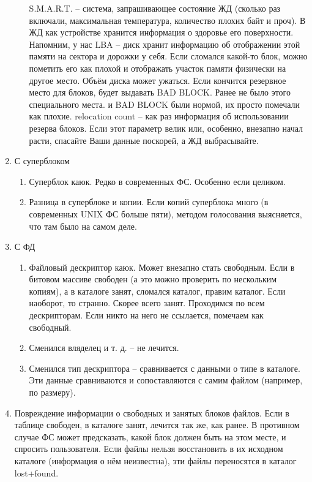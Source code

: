 \documentclass[a4paper,10pt]{article}
\begin{document}
\begin{enumerate}
\begin{enumerate}
 S.M.A.R.T. -- система, запрашивающее состояние ЖД (сколько раз включали, максимальная температура, количество плохих байт и проч).
 В ЖД как устройстве хранится информация о здоровье его поверхности. Напомним, у нас LBA -- диск хранит информацию об отображении этой памяти на сектора и дорожки у себя. Если сломался какой-то блок, можно пометить его как плохой и отображать участок памяти физически на другое место. Объём диска может ужаться. Если кончится резервное место для блоков, будет выдавать BAD BLOCK.
 Ранее не было этого специального места. и BAD BLOCK были нормой, их просто помечали как плохие.
 relocation count -- как раз информация об использовании резерва блоков. Если этот параметр велик или, особенно, внезапно начал расти, спасайте Ваши данные поскорей, а ЖД выбрасывайте.
 \end{enumerate}
 \item С суперблоком
 \begin{enumerate}
 \item Суперблок каюк. Редко в современных ФС. Особенно если целиком.
 \item Разница в суперблоке и копии. Если копий суперблока много (в современных UNIX ФС больше пяти), методом голосования выясняется, что там было на самом деле.
 \end{enumerate}
 \item С ФД
 \begin{enumerate}
 \item Файловый дескриптор каюк.
 Может внезапно стать свободным.
 Если в битовом массиве свободен (а это можно проверить по нескольким копиям), а в каталоге занят, сломался каталог, правим каталог.
 Если наоборот, то странно. Скорее всего занят. Проходимся по всем дескрипторам. Если никто на него не ссылается, помечаем как свободный. 
 \item Сменился вляделец и т. д. -- не лечится.
 \item Сменился тип дескриптора -- сравнивается с данными о типе в каталоге. Эти данные сравниваются и сопоставляются с самим файлом (например, по размеру).
 \end{enumerate}
 \item Повреждение информации о свободных и занятых блоков файлов.
 Если в таблице свободен, в каталоге занят, лечится так же, как ранее. В противном случае ФС может предсказать, какой блок должен быть на этом месте, и спросить пользователя.
 Если файлы нельзя восстановить в их исходном каталоге (информация о нём неизвестна), эти файлы переносятся в каталог lost+found.

\end{enumerate}
\end{document}
